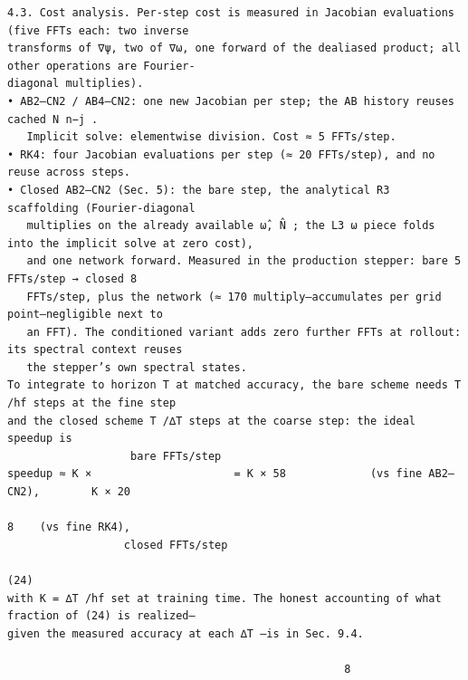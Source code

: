 \documentclass[letterpaper]{article}
\begin{document}
\begin{Verbatim}[fontsize=\fontsize{6.35}{7.15}\selectfont,breaklines=false]
4.3. Cost analysis. Per-step cost is measured in Jacobian evaluations (five FFTs each: two inverse
transforms of ∇ψ, two of ∇ω, one forward of the dealiased product; all other operations are Fourier-
diagonal multiplies).
• AB2–CN2 / AB4–CN2: one new Jacobian per step; the AB history reuses cached N n−j .
   Implicit solve: elementwise division. Cost ≈ 5 FFTs/step.
• RK4: four Jacobian evaluations per step (≈ 20 FFTs/step), and no reuse across steps.
• Closed AB2–CN2 (Sec. 5): the bare step, the analytical R3 scaffolding (Fourier-diagonal
   multiplies on the already available ω̂, N̂ ; the L3 ω piece folds into the implicit solve at zero cost),
   and one network forward. Measured in the production stepper: bare 5 FFTs/step → closed 8
   FFTs/step, plus the network (≈ 170 multiply–accumulates per grid point—negligible next to
   an FFT). The conditioned variant adds zero further FFTs at rollout: its spectral context reuses
   the stepper’s own spectral states.
To integrate to horizon T at matched accuracy, the bare scheme needs T /hf steps at the fine step
and the closed scheme T /∆T steps at the coarse step: the ideal speedup is
                   bare FFTs/step
speedup ≈ K ×                      = K × 58             (vs fine AB2–CN2),        K × 20
                                                                                      8    (vs fine RK4),
                  closed FFTs/step
                                                                                               (24)
with K = ∆T /hf set at training time. The honest accounting of what fraction of (24) is realized—
given the measured accuracy at each ∆T —is in Sec. 9.4.

                                                    8
\end{Verbatim}
\newpage
\end{document}
